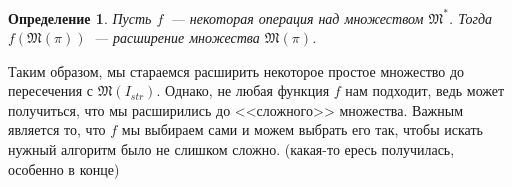 \documentclass[a4paper, 12pt]{report}
\newtheorem*{definition}{Определение}
\begin{document}
\begin{definition} 
Пусть $f$~--- некоторая операция над множеством $\mathfrak{M}^*$. Тогда $f(\mathfrak{M}(\pi))$~--- расширение множества $\mathfrak{M}(\pi)$. 
\end{definition}

Таким образом, мы стараемся расширить некоторое простое множество до пересечения с $\mathfrak{M}(I_{str})$. Однако, не любая функция $f$ нам подходит, ведь может получиться, что мы расширились до <<сложного>> множества. Важным является то, что $f$ мы выбираем сами и можем выбрать его так, чтобы искать нужный алгоритм было не слишком сложно. (какая-то ересь получилась, особенно в конце)
\end{document}
